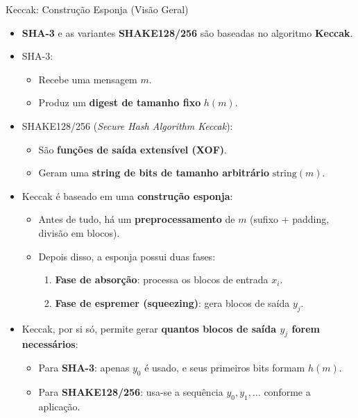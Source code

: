 \documentclass{beamer}
\begin{document}
\begin{frame}{Keccak: Construção Esponja (Visão Geral)}
  \begin{itemize}
    \item \textbf{SHA-3} e as variantes \textbf{SHAKE128/256} são baseadas no algoritmo \textbf{Keccak}.
    \item SHA-3:
      \begin{itemize}
        \item Recebe uma mensagem $m$.
        \item Produz um \textbf{digest de tamanho fixo} $h(m)$.
      \end{itemize}
    \item SHAKE128/256 (\textit{Secure Hash Algorithm Keccak}):
      \begin{itemize}
        \item São \textbf{funções de saída extensível (XOF)}.
        \item Geram uma \textbf{string de bits de tamanho arbitrário} $\text{string}(m)$.
      \end{itemize}
    \item Keccak é baseado em uma \textbf{construção esponja}:
      \begin{itemize}
        \item Antes de tudo, há um \textbf{preprocessamento} de $m$ (sufixo + padding, divisão em blocos).
        \item Depois disso, a esponja possui duas fases:
          \begin{enumerate}
            \item \textbf{Fase de absorção}: processa os blocos de entrada $x_i$.
            \item \textbf{Fase de espremer (squeezing)}: gera blocos de saída $y_j$.
          \end{enumerate}
      \end{itemize}
    \item Keccak, por si só, permite gerar \textbf{quantos blocos de saída $y_j$ forem necessários}:
      \begin{itemize}
        \item Para \textbf{SHA-3}: apenas $y_0$ é usado, e seus primeiros bits formam $h(m)$.
        \item Para \textbf{SHAKE128/256}: usa-se a sequência $y_0, y_1, \dots$ conforme a aplicação.
      \end{itemize}
  \end{itemize}
\end{frame}
\end{document}
